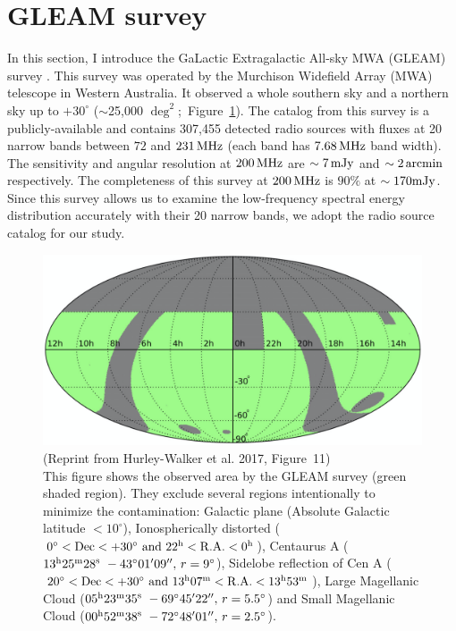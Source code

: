 \section{GLEAM survey}\label{sec:gleamsurvey}

In this section, I introduce the GaLactic Extragalactic All-sky MWA (GLEAM) survey \citep{Hurley-Walker2017a}.
This survey was operated by the Murchison Widefield Array (MWA) telescope \citep{Tingay2013a} in Western Australia.
It observed a whole southern sky and a northern sky up to $+30^{\circ}$ ($\sim$25,000 $\mathrm{\deg}^2$;~Figure~\ref{fig:HurleyWalker2017_figure11}).
The catalog from this survey is a publicly-available and contains 307,455 detected radio sources with fluxes at 20 narrow bands between $72$ and $231\,\mathrm{MHz}$ (each band has $7.68\,\mathrm{MHz}$ band width).
The sensitivity and angular resolution at $200\,\mathrm{MHz}$ are $\sim 7\,\mathrm{mJy}$ and $\sim 2\,\mathrm{arcmin}$ respectively.
The completeness of this survey at $200\,\mathrm{MHz}$ is $90\%$ at $\sim 170\mathrm{mJy}$.
Since this survey allows us to examine the low-frequency spectral energy distribution accurately with their 20 narrow bands, we adopt the radio source catalog for our study.

\begin{figure}[htbp]
	\centering
	\includegraphics[width=.7\linewidth]{Chapter_3/Figures/HurleyWalker_Figure11.png}
    \caption[Reprint from Hurley-Walker et al. 2017 (Figure~11)]{\label{fig:HurleyWalker2017_figure11}
        (Reprint from Hurley-Walker et al. 2017, Figure~11)\\
        This figure shows the observed area by the GLEAM survey (green shaded region).
        They exclude several regions intentionally to minimize the contamination:
        Galactic plane (Absolute Galactic latitude $<10^{\circ}$),
        Ionospherically distorted ($0^{\circ} < \mathrm{Dec} < +30^{\circ}\ \mathrm{and}\ 22^{\mathrm{h}} < \mathrm{R.A.} < 0^{\mathrm{h}}$),
        Centaurus A ($13\msu{h}25\msu{m}28\msu{s}\ -43^{\circ}01'09'',\,r=9^{\circ}$),
        Sidelobe reflection of Cen A ($20^{\circ} < \mr{Dec} < +30^{\circ}\ \mr{and}\ 13\msu{h}07\msu{m} < \mr{R.A.} < 13\msu{h}53\msu{m}$),
        Large Magellanic Cloud ($05\msu{h}23\msu{m}35\msu{s}\ -69^{\circ}45'22'',\,r=5.5^{\circ}$) and Small Magellanic Cloud ($00\msu{h}52\msu{m}38\msu{s}\ -72^{\circ}48'01'',\,r=2.5^{\circ}$).
    }
\end{figure}






%
%
